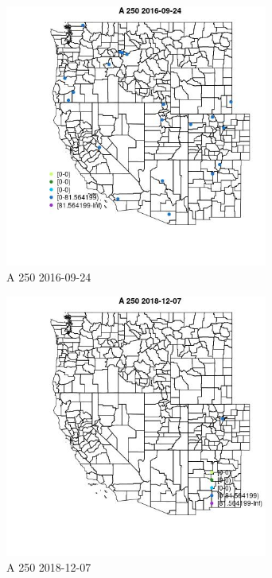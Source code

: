 \begin{figure} 
\centering  
\includegraphics[width=0.77\textwidth]{Code_Outputs/Report_ML_input_PM25_Step4_part_e_de_duplicated_aves_MapObsA_2502016-09-24.jpg} 
\caption{\label{fig:Report_ML_input_PM25_Step4_part_e_de_duplicated_avesMapObsA_2502016-09-24}A 250 2016-09-24} 
\end{figure} 
 

\begin{figure} 
\centering  
\includegraphics[width=0.77\textwidth]{Code_Outputs/Report_ML_input_PM25_Step4_part_e_de_duplicated_aves_MapObsA_2502018-12-07.jpg} 
\caption{\label{fig:Report_ML_input_PM25_Step4_part_e_de_duplicated_avesMapObsA_2502018-12-07}A 250 2018-12-07} 
\end{figure} 
 


